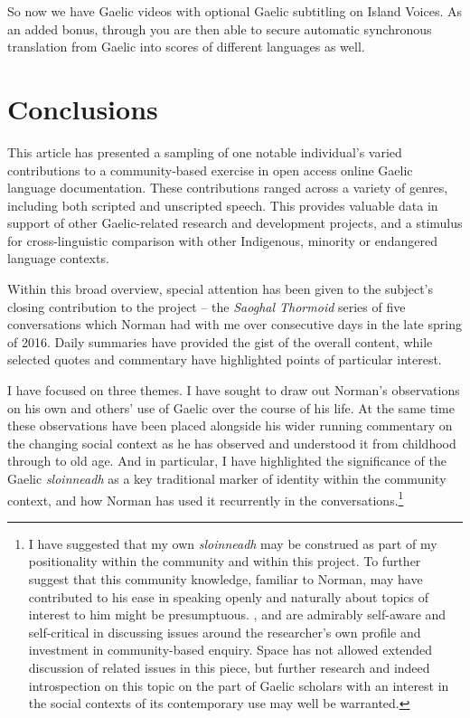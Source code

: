 \documentclass[output=paper,colorlinks,citecolor=brown]{langscibook}
\begin{document}
So now we have Gaelic videos with optional Gaelic subtitling on Island Voices. As an added bonus, through  you are then able to secure automatic synchronous translation from Gaelic into scores of different languages as well.

\section{Conclusions}

This article has presented a sampling of one notable individual’s varied contributions to a community-based exercise in open access online Gaelic language documentation. These contributions ranged across a variety of genres, including both scripted and unscripted speech. This provides valuable data in support of other Gaelic-related research and development projects, and a stimulus for cross-linguistic comparison with other Indigenous, minority or endangered language contexts.

Within this broad overview, special attention has been given to the subject’s closing contribution to the project – the \textit{Saoghal Thormoid} series of five conversations which Norman had with me over consecutive days in the late spring of 2016. Daily summaries have provided the gist of the overall content, while selected quotes and commentary have highlighted points of particular interest. 

I have focused on three themes. I have sought to draw out Norman’s observations on his own and others’ use of Gaelic over the course of his life. At the same time these observations have been placed alongside his wider running commentary on the changing social context as he has observed and understood it from childhood through to old age. And in particular, I have highlighted the significance of the Gaelic \textit{sloinneadh} as a key traditional marker of identity within the community context, and how Norman has used it recurrently in the conversations.\footnote{I have suggested that my own \textit{sloinneadh} may be construed as part of my positionality within the community and within this project. To further suggest that this community knowledge, familiar to Norman, may have contributed to his ease in speaking openly and naturally about topics of interest to him might be presumptuous. \citet{gw:Venkatesh2002}, and \citet{gw:JaspersMeeuwis2013} are admirably self-aware and self-critical in discussing issues around the researcher’s own profile and investment in community-based enquiry. Space has not allowed extended discussion of related issues in this piece, but further research and indeed introspection on this topic on the part of Gaelic scholars with an interest in the social contexts of its contemporary use may well be warranted.}
\end{document}
